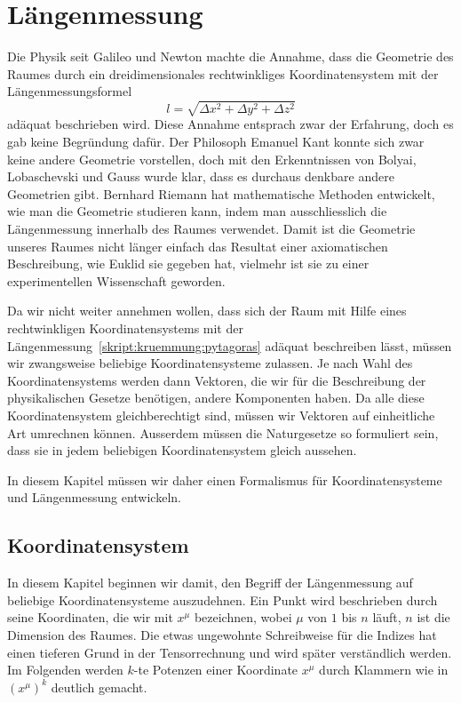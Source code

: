 %
%
%
\chapter{Längenmessung
\label{skript:chapter:laengenmessung}}
\rhead{}

Die Physik seit Galileo und Newton machte die Annahme, dass die
Geometrie des Raumes durch ein dreidimensionales rechtwinkliges
Koordinatensystem mit der Längenmessungsformel
\begin{equation}
l=\sqrt{\Delta x^2+\Delta y^2+\Delta z^2}
\label{skript:kruemmung:pytagoras}
\end{equation}
adäquat beschrieben wird.
Diese Annahme entsprach zwar der Erfahrung, doch es gab keine
Begründung dafür.
Der Philosoph Emanuel Kant konnte sich zwar keine andere Geometrie
vorstellen, doch mit den Erkenntnissen von Bolyai, Lobaschevski
und Gauss wurde klar, dass es durchaus denkbare andere Geometrien
gibt.
Bernhard Riemann hat mathematische Methoden entwickelt, wie man die
Geometrie studieren kann, indem man ausschliesslich die Längenmessung
innerhalb des Raumes verwendet.
Damit ist die Geometrie unseres Raumes nicht länger einfach das
Resultat einer axiomatischen Beschreibung, wie Euklid sie gegeben hat,
vielmehr ist sie zu einer experimentellen Wissenschaft geworden.

Da wir nicht weiter annehmen wollen, dass sich der Raum mit Hilfe
eines rechtwinkligen Koordinatensystems mit der
Längenmessung~\eqref{skript:kruemmung:pytagoras}
adäquat beschreiben lässt, müssen wir zwangsweise beliebige
Koordinatensysteme zulassen.
Je nach Wahl des Koordinatensystems werden dann Vektoren, die
wir für die Beschreibung der physikalischen Gesetze benötigen,
andere Komponenten haben.
Da alle diese Koordinatensystem gleichberechtigt sind, müssen
wir Vektoren auf einheitliche Art umrechnen können.
Ausserdem müssen die Naturgesetze so formuliert sein, dass
sie in jedem beliebigen Koordinatensystem gleich aussehen.

In diesem Kapitel müssen wir daher einen Formalismus für
Koordinatensysteme und Längenmessung entwickeln.

\section{Koordinatensystem}
In diesem Kapitel beginnen wir damit, den Begriff der Längenmessung
auf beliebige Koordinatensysteme auszudehnen.
Ein Punkt wird beschrieben durch seine Koordinaten, die wir mit
$x^\mu$ bezeichnen, wobei $\mu$ von $1$ bis $n$ läuft, $n$
ist die Dimension des Raumes. 
Die etwas ungewohnte Schreibweise für die Indizes
hat einen tieferen Grund in der Tensorrechnung und wird später
verständlich werden.
Im Folgenden werden $k$-te Potenzen einer Koordinate $x^\mu$ durch
Klammern wie in $(x^\mu)^k$ deutlich gemacht.

